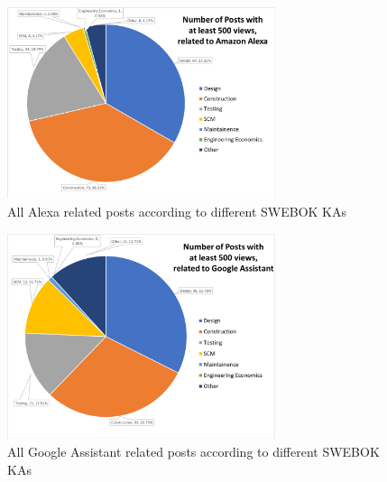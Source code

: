 \documentclass{sigchi}
\begin{document}
\begin{figure}[ht]
	\centering
\includegraphics[width=0.7\textwidth,height=0.7\textheight,keepaspectratio]{RQ6_AlexaPosts500.png}
    \caption{All Alexa related posts according to different SWEBOK KAs}
    \label{fig:AlexaPostsSWEBOK}
\end{figure}
\begin{figure}[ht]
	\centering
\includegraphics[width=0.7\textwidth,height=0.7\textheight,keepaspectratio]{RQ6_GHomePosts500.png}
    \caption{All Google Assistant related posts according to different SWEBOK KAs}
    \label{fig:GAPostsSwebok}
\end{figure}
\end{document}
